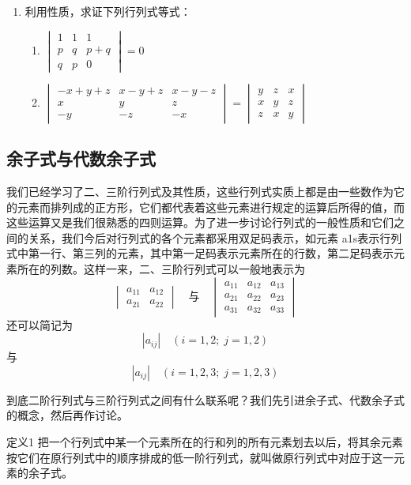 \begin{ex}
\begin{enumerate}
\item 利用性质，求证下列行列式等式：
\begin{enumerate}
    \item $\begin{vmatrix}
        1&1&1\\p&q&p+q\\q&p&0
    \end{vmatrix}=0$
    \item $\begin{vmatrix}
        -x+y+z&x-y+z&x-y-z\\
        x&y&z\\
        -y&-z&-x
    \end{vmatrix}=\begin{vmatrix}
        y&z&x\\x&y&z\\z&x&y
    \end{vmatrix}$
\end{enumerate}
\end{enumerate}
\end{ex}

\subsection{余子式与代数余子式}

我们已经学习了二、三阶行列式及其性质，这些行列式实质上都是由一些数作为它的元素而排列成的正方形，它们都代表着这些元素进行规定的运算后所得的值，而这些运算又是我们很熟悉的四则运算。为了进一步讨论行列式的一般性质和它们之间的关系，我们今后对行列式的各个元素都采用双足码表示，如元素 a1s表示行列式中第一行、第三列的元素，其中第一足码表示元素所在的行数，第二足码表示元素所在的列数。这样一来，二、三阶行列式可以一般地表示为
\[\begin{vmatrix}
    a_{11}&a_{12}\\a_{21}&a_{22}
\end{vmatrix}\quad\text{与}\quad  \begin{vmatrix}
    a_{11}&a_{12}&a_{13}\\
    a_{21}&a_{22}&a_{23}\\
    a_{31}&a_{32}&a_{33}
\end{vmatrix}\]
还可以简记为
\[|a_{ij}|\quad (i=1,2;\; j=1,2)\]
与
\[|a_{ij}|\quad (i=1,2,3;\; j=1,2,3)\]

到底二阶行列式与三阶行列式之间有什么联系呢？我们先引进余子式、代数余子式的概念，然后再作讨论。

\begin{blk}{定义1}
    把一个行列式中某一个元素所在的行和列的所有元素划去以后，将其余元素按它们在原行列式中的顺序排成的低一阶行列式，就叫做原行列式中对应于这一元素的余子式。
\end{blk}

